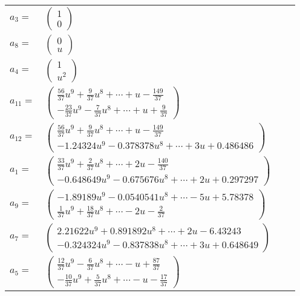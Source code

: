 \documentclass[1p]{elsarticle_modified}
\theoremstyle{definition}
\begin{document}
\begin{tabular}{m{7pt} m{180pt} m{7pt} m{180pt} }
\flushright $a_{3}=$&$\begin{pmatrix}1\\0\end{pmatrix}$ \\
\flushright $a_{8}=$&$\begin{pmatrix}0\\u\end{pmatrix}$ \\
\flushright $a_{4}=$&$\begin{pmatrix}1\\u^2\end{pmatrix}$ \\
\flushright $a_{11}=$&$\begin{pmatrix}\frac{56}{37} u^9+\frac{9}{37} u^8+\cdots+u-\frac{149}{37}\\-\frac{23}{37} u^9-\frac{7}{37} u^8+\cdots+u+\frac{9}{37}\end{pmatrix}$ \\
\flushright $a_{12}=$&$\begin{pmatrix}\frac{56}{37} u^9+\frac{9}{37} u^8+\cdots+u-\frac{149}{37}\\-1.24324 u^{9}-0.378378 u^{8}+\cdots+3 u+0.486486\end{pmatrix}$ \\
\flushright $a_{1}=$&$\begin{pmatrix}\frac{33}{37} u^9+\frac{2}{37} u^8+\cdots+2 u-\frac{140}{37}\\-0.648649 u^{9}-0.675676 u^{8}+\cdots+2 u+0.297297\end{pmatrix}$ \\
\flushright $a_{9}=$&$\begin{pmatrix}-1.89189 u^{9}-0.0540541 u^{8}+\cdots-5 u+5.78378\\\frac{1}{37} u^9+\frac{18}{37} u^8+\cdots-2 u-\frac{2}{37}\end{pmatrix}$ \\
\flushright $a_{7}=$&$\begin{pmatrix}2.21622 u^{9}+0.891892 u^{8}+\cdots+2 u-6.43243\\-0.324324 u^{9}-0.837838 u^{8}+\cdots+3 u+0.648649\end{pmatrix}$ \\
\flushright $a_{5}=$&$\begin{pmatrix}\frac{12}{37} u^9-\frac{6}{37} u^8+\cdots- u+\frac{87}{37}\\-\frac{10}{37} u^9+\frac{5}{37} u^8+\cdots- u-\frac{17}{37}\end{pmatrix}$ \\

\end{tabular}
\end{document}
